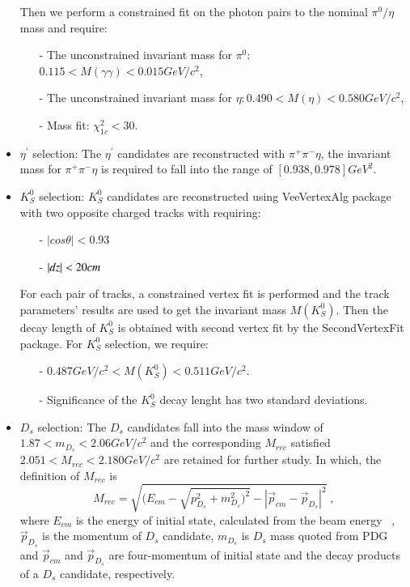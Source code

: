 \begin{itemize}
		Then we perform a constrained fit on the photon pairs to the nominal $\pi^{0}/\eta$ mass and require:
		\begin{itemize}
			\item[-] The unconstrained invariant mass for $\pi^{0}$: $0.115 < M(\gamma\gamma) < 0.015 GeV/c^{2}$,
			\item[-] The unconstrained invariant mass for $\eta: 0.490 < M(\eta) < 0.580 GeV/c^{2}$,
			\item[-] Mass fit: $\chi_{1c}^{2} < 30$.
		\end{itemize}
	\item $\eta^{'}$ selection: The $\eta^{'}$ candidates are reconstructed with $\pi^{+}\pi^{-}\eta$, the invariant mass for $\pi^{+}\pi^{-}\eta$ is required to fall into the range of $[0.938, 0.978] GeV^{2}$.
	\item $K_{S}^{0}$ selection: $K_{S}^{0}$ candidates are reconstructed using VeeVertexAlg package with two opposite charged tracks with requiring:
		\begin{itemize}
			\item[-] $|cos\theta| < 0.93$
			\item[-] $|dz| < 20 \emph{cm} $
		\end{itemize}

		For each pair of tracks, a constrained vertex fit is performed and the track parameters' results are used to get the invariant mass $M(K_{S}^{0})$. Then the decay length of $K_{S}^{0}$ is obtained with second vertex 
		fit by the SecondVertexFit package. For $K_{S}^{0}$ selection, we require:
		\begin{itemize}
			\item[-] $0.487GeV/c^{2} < M(K_S^{0}) < 0.511 GeV/c^{2}$.
			\item[-] Significance of the $K_{S}^{0}$ decay lenght has two standard deviations.
		\end{itemize}

	\item $D_{s}$ selection: The $D_{s}$ candidates fall into the mass window of $1.87 < m_{D_{s}} < 2.06 GeV/c^{2}$ and 
		the corresponding $M_{rec}$ satisfied $2.051 < M_{rec} < 2.180 GeV/c^{2}$ are retained for further study. In which, the definition of $M_{rec}$ is
		\begin{equation}
			M_{rec} = \sqrt{(E_{cm} - \sqrt{p_{D_{s}}^{2} + m_{D_{s}}^{2})^{2}} - |\vec p_{cm} - \vec p_{D_{s}} | ^{2}} \; , \label{con:inventoryflow}
		\end{equation}
		where $E_{cm}$ is the energy of initial state, calculated from the beam energy ~\cite{DocDB 580-v1}, $\vec p_{D_{s}}$ is the momentum of $D_{s}$ candidate, $m_{D_{s}}$ is $D_{s}$ mass quoted from PDG ~\cite{PDG} and $\vec p_{cm}$ and $\vec p_{D_{s}}$ are four-momentum of initial state and the decay products of a $D_{s}$ candidate, respectively.
\end{itemize}

